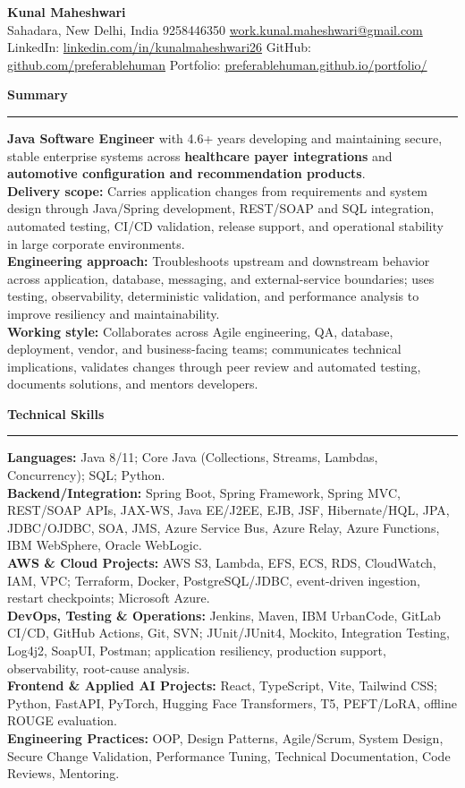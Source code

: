 \documentclass[11pt,letterpaper]{article}
\newcommand{\ressection}[1]{\Needspace{6\baselineskip}\vspace{8pt}\par\textbf{#1}\par\vspace{2pt}\hrule\vspace{5pt}}
\begin{document}
\pagestyle{empty}\raggedright\fontsize{11}{12.5}\selectfont

{\Large \textbf{Kunal Maheshwari}}\\
Sahadara, New Delhi, India \textbar{} 9258446350 \textbar{} \href{mailto:work.kunal.maheshwari@gmail.com}{work.kunal.maheshwari@gmail.com}\\
LinkedIn: \href{https://www.linkedin.com/in/kunalmaheshwari26}{linkedin.com/in/kunalmaheshwari26} \textbar{} GitHub: \href{https://github.com/preferablehuman}{github.com/preferablehuman} \textbar{} Portfolio: \href{https://preferablehuman.github.io/portfolio/}{preferablehuman.github.io/portfolio/}

\ressection{Summary}
\textbf{Java Software Engineer} with 4.6+ years developing and maintaining secure, stable enterprise systems across \textbf{healthcare payer integrations} and \textbf{automotive configuration and recommendation products}.\\[2pt]
\textbf{Delivery scope:} Carries application changes from requirements and system design through Java/Spring development, REST/SOAP and SQL integration, automated testing, CI/CD validation, release support, and operational stability in large corporate environments.\\[2pt]
\textbf{Engineering approach:} Troubleshoots upstream and downstream behavior across application, database, messaging, and external-service boundaries; uses testing, observability, deterministic validation, and performance analysis to improve resiliency and maintainability.\\[2pt]
\textbf{Working style:} Collaborates across Agile engineering, QA, database, deployment, vendor, and business-facing teams; communicates technical implications, validates changes through peer review and automated testing, documents solutions, and mentors developers.

\ressection{Technical Skills}
\textbf{Languages:} Java 8/11; Core Java (Collections, Streams, Lambdas, Concurrency); SQL; Python.\\
\textbf{Backend/Integration:} Spring Boot, Spring Framework, Spring MVC, REST/SOAP APIs, JAX-WS, Java EE/J2EE, EJB, JSF, Hibernate/HQL, JPA, JDBC/OJDBC, SOA, JMS, Azure Service Bus, Azure Relay, Azure Functions, IBM WebSphere, Oracle WebLogic.\\
\textbf{AWS \& Cloud Projects:} AWS S3, Lambda, EFS, ECS, RDS, CloudWatch, IAM, VPC; Terraform, Docker, PostgreSQL/JDBC, event-driven ingestion, restart checkpoints; Microsoft Azure.\\
\textbf{DevOps, Testing \& Operations:} Jenkins, Maven, IBM UrbanCode, GitLab CI/CD, GitHub Actions, Git, SVN; JUnit/JUnit4, Mockito, Integration Testing, Log4j2, SoapUI, Postman; application resiliency, production support, observability, root-cause analysis.\\
\textbf{Frontend \& Applied AI Projects:} React, TypeScript, Vite, Tailwind CSS; Python, FastAPI, PyTorch, Hugging Face Transformers, T5, PEFT/LoRA, offline ROUGE evaluation.\\
\textbf{Engineering Practices:} OOP, Design Patterns, Agile/Scrum, System Design, Secure Change Validation, Performance Tuning, Technical Documentation, Code Reviews, Mentoring.
\end{document}
